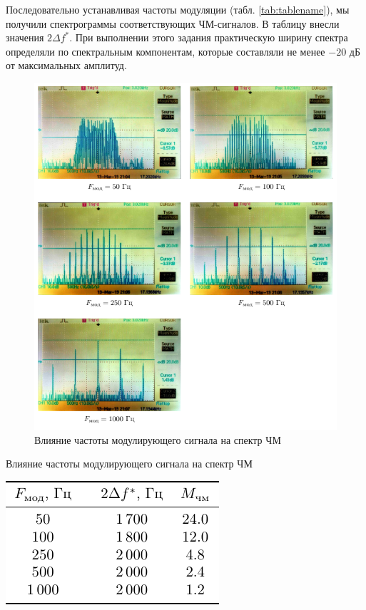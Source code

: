\documentclass[a4paper,12pt]{article}
\begin{document}
Последовательно устанавливая частоты модуляции (табл. \ref{tab:tablename}), мы получили спектрограммы соответствующих ЧМ-сигналов. В таблицу внесли значения $2\Delta f^*$.  При выполнении этого задания практическую ширину спектра определяли по спектральным компонентам, которые составляли не менее $-20$ дБ от максимальных амплитуд.


\begin{figure}[H]
	\centering
	\includegraphics[width=\textwidth]{plot/F}
	\caption{Влияние частоты модулирующего сигнала на спектр ЧМ}
	\label{fig:figureF}
\end{figure}

\begin{table}[H]
	\caption{Влияние частоты модулирующего сигнала на спектр ЧМ}
	\vspace{1em}
	\label{tab:tablename}
	\centering
	\includegraphics[scale=1.2]{plot/tab4.pdf}
\end{table}
\end{document}
